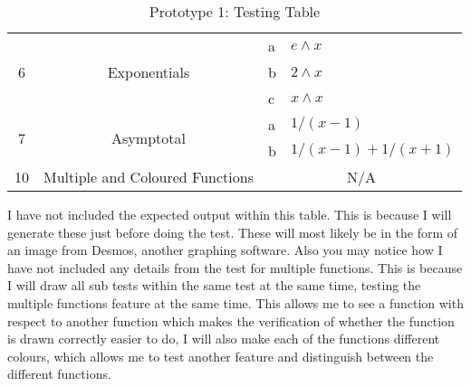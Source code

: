 \documentclass[../../../../main.tex]{subfiles}
\begin{document}
\begin{table}[H]
\begin{tabular}{|c|c|l|l|}
\multirow{3}{*}{6} & \multirow{3}{*}{Exponentials}                              & a                                    & $e\wedge x$               \\ \cline{3-4} 
                   &                                                            & b                                    & $2\wedge x$               \\ \cline{3-4} 
                   &                                                            & c                                    & $x\wedge x$               \\ \hline
\multirow{2}{*}{7} & \multirow{2}{*}{Asymptotal}                                & a                                    & $1/(x-1)$           \\ \cline{3-4} 
                   &                                                            & b                                    & $1/(x-1) + 1/(x+1)$ \\ \hline
10                 & Multiple and Coloured Functions                            & \multicolumn{2}{c|}{N/A}                                   \\ \hline
\end{tabular}
\caption{Prototype 1: Testing Table}
\end{table}

I have not included the expected output within this table. This is because I will generate these just before doing the test. These will most likely be in the form of an image from Desmos, another graphing software. Also you may notice how I have not included any details from the test for multiple functions. This is because I will draw all sub tests within the same test at the same time, testing the multiple functions feature at the same time. This allows me to see a function with respect to another function which makes the verification of whether the function is drawn correctly easier to do, I will also make each of the functions different colours, which allows me to test another feature and distinguish between the different functions.
\newpage
\end{document}
